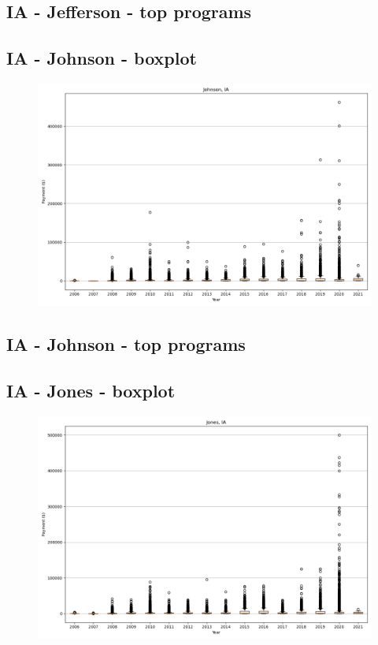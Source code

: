 \subsection*{IA - Jefferson - top programs}

\newpage
\subsection*{IA - Johnson - boxplot}
\begin{figure}[h]
\centering
\includegraphics[width=7in]{../output/boxplots/counties/Johnson-IA_boxplot.png}
\end{figure}


\subsection*{IA - Johnson - top programs}

\newpage
\subsection*{IA - Jones - boxplot}
\begin{figure}[h]
\centering
\includegraphics[width=7in]{../output/boxplots/counties/Jones-IA_boxplot.png}
\end{figure}


